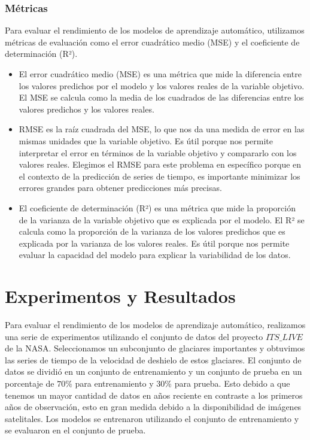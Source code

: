 \documentclass[sigconf,authordraft,language=spanish]{acmart}
\begin{document}
\subsubsection{Métricas}

Para evaluar el rendimiento de los modelos de aprendizaje automático, utilizamos métricas de evaluación como el error cuadrático medio (MSE) y el coeficiente de determinación (R²).

\begin{itemize}
  \item El error cuadrático medio (MSE) es una métrica que mide la diferencia entre los valores predichos por el modelo y los valores reales de la variable objetivo.
El MSE se calcula como la media de los cuadrados de las diferencias entre los valores predichos y los valores reales.
  \item RMSE es la raíz cuadrada del MSE, lo que nos da una medida de error en las mismas unidades que la variable objetivo.
  Es útil porque nos permite interpretar el error en términos de la variable objetivo y compararlo con los valores reales.
Elegimos el RMSE para este problema en específico porque en el contexto de la predicción de series de tiempo, es importante minimizar los errores grandes para obtener predicciones más precisas.
  \item El coeficiente de determinación (R²) es una métrica que mide la proporción de la varianza de la variable objetivo que es explicada por el modelo.
El R² se calcula como la proporción de la varianza de los valores predichos que es explicada por la varianza de los valores reales.
Es útil porque nos permite evaluar la capacidad del modelo para explicar la variabilidad de los datos.
\end{itemize}

\section{Experimentos y Resultados}

Para evaluar el rendimiento de los modelos de aprendizaje automático, realizamos una serie de experimentos utilizando el conjunto de datos del proyecto  $ITS\_LIVE$ de la NASA.
Seleccionamos un subconjunto de glaciares importantes y obtuvimos las series de tiempo de la velocidad de deshielo de estos glaciares.
El conjunto de datos se dividió en un conjunto de entrenamiento y un conjunto de prueba en un porcentaje de $70\%$ para entrenamiento y $30\%$ para prueba.
Esto debido a que tenemos un mayor cantidad de datos en años reciente en contraste a los primeros años de observación, esto en gran medida debido a la disponibilidad de imágenes satelitales.  
Los modelos se entrenaron utilizando el conjunto de entrenamiento y se evaluaron en el conjunto de prueba.
\end{document}
